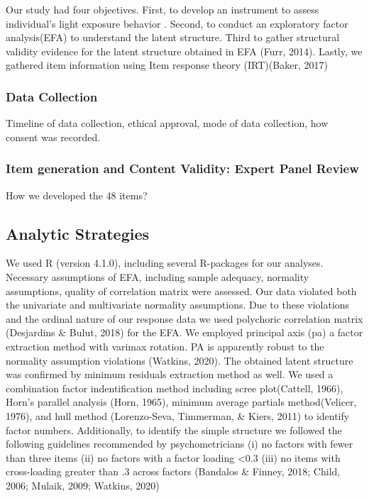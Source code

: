 \documentclass[
  english,
  man]{apa6}
\begin{document}
Our study had four objectives. First, to develop an instrument to assess individual's light exposure behavior . Second, to conduct an exploratory factor analysis(EFA) to understand the latent structure. Third to gather structural validity evidence for the latent structure obtained in EFA (Furr, 2014). Lastly, we gathered item information using Item response theory (IRT)(Baker, 2017)

\hypertarget{data-collection}{%
\subsubsection{Data Collection}\label{data-collection}}

Timeline of data collection, ethical approval, mode of data collection, how consent was recorded.

\hypertarget{item-generation-and-content-validity-expert-panel-review}{%
\subsubsection{Item generation and Content Validity: Expert Panel Review}\label{item-generation-and-content-validity-expert-panel-review}}

How we developed the 48 items?

\hypertarget{analytic-strategies}{%
\subsection{Analytic Strategies}\label{analytic-strategies}}

We used R (version 4.1.0), including several R-packages for our analyses. Necessary assumptions of EFA, including sample adequacy, normality assumptions, quality of correlation matrix were assessed. Our data violated both the univariate and multivariate normality assumptions. Due to these violations and the ordinal nature of our response data we used polychoric correlation matrix (Desjardins \& Bulut, 2018) for the EFA. We employed principal axis (pa) a factor extraction method with varimax rotation. PA is apparently robust to the normality assumption violations (Watkins, 2020). The obtained latent structure was confirmed by minimum residuals extraction method as well. We used a combination factor indentification method including scree plot(Cattell, 1966), Horn's parallel analysis (Horn, 1965), minimum average partials method(Velicer, 1976), and hull method (Lorenzo-Seva, Timmerman, \& Kiers, 2011) to identify factor numbers. Additionally, to identify the simple structure we followed the following guidelines recommended by psychometricians (i) no factors with fewer than three items (ii) no factors with a factor loading \textless0.3 (iii) no items with cross-loading greater than .3 across factors (Bandalos \& Finney, 2018; Child, 2006; Mulaik, 2009; Watkins, 2020)
\end{document}
